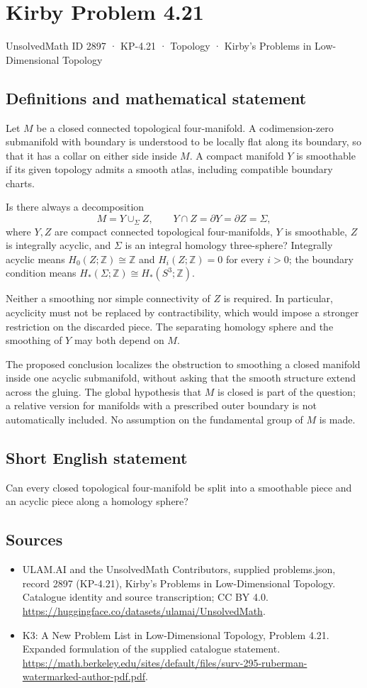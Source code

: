 \documentclass[11pt,a4paper]{article}
\begin{document}
\section*{Kirby Problem 4.21}\label{2897}
{\small UnsolvedMath ID 2897 · KP-4.21 · Topology · Kirby's Problems in Low-Dimensional Topology}
\subsection{Definitions and mathematical statement}
Let $M$ be a closed connected topological four-manifold. A codimension-zero submanifold with boundary is understood to be locally flat along its boundary, so that it has a collar on either side inside $M$. A compact manifold $Y$ is smoothable if its given topology admits a smooth atlas, including compatible boundary charts.

Is there always a decomposition
\[
M=Y\cup_\Sigma Z,\qquad
Y\cap Z=\partial Y=\partial Z=\Sigma,
\]
where $Y,Z$ are compact connected topological four-manifolds, $Y$ is smoothable, $Z$ is integrally acyclic, and $\Sigma$ is an integral homology three-sphere? Integrally acyclic means $H_0(Z;\mathbb Z)\cong\mathbb Z$ and $H_i(Z;\mathbb Z)=0$ for every $i>0$; the boundary condition means $H_*(\Sigma;\mathbb Z)\cong H_*(S^3;\mathbb Z)$.

Neither a smoothing nor simple connectivity of $Z$ is required. In particular, acyclicity must not be replaced by contractibility, which would impose a stronger restriction on the discarded piece. The separating homology sphere and the smoothing of $Y$ may both depend on $M$.

The proposed conclusion localizes the obstruction to smoothing a closed manifold inside one acyclic submanifold, without asking that the smooth structure extend across the gluing. The global hypothesis that $M$ is closed is part of the question; a relative version for manifolds with a prescribed outer boundary is not automatically included. No assumption on the fundamental group of $M$ is made.
\subsection{Short English statement}
Can every closed topological four-manifold be split into a smoothable piece and an acyclic piece along a homology sphere?
\subsection{Sources}
\begin{itemize}
\item[S1] ULAM.AI and the UnsolvedMath Contributors, supplied problems.json, record 2897 (KP-4.21), Kirby's Problems in Low-Dimensional Topology. Catalogue identity and source transcription; CC BY 4.0.
\url{https://huggingface.co/datasets/ulamai/UnsolvedMath}.
\item[S2] K3: A New Problem List in Low-Dimensional Topology, Problem 4.21. Expanded formulation of the supplied catalogue statement.
\url{https://math.berkeley.edu/sites/default/files/surv-295-ruberman-watermarked-author-pdf.pdf}.
\end{itemize}
\end{document}
